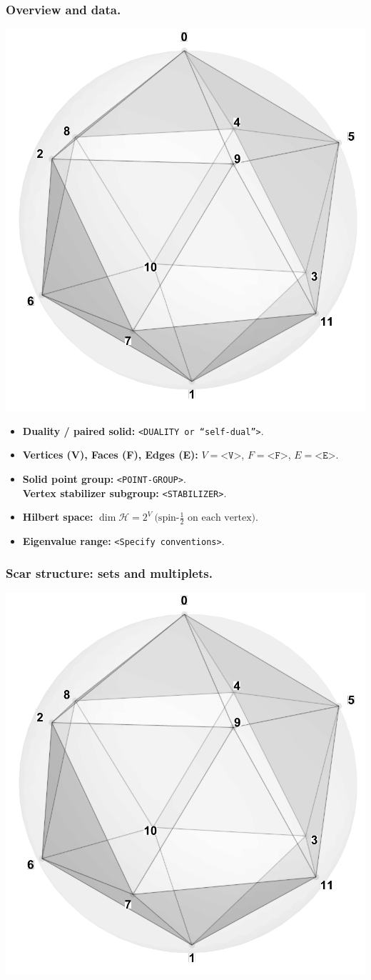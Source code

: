 \documentclass[11pt,a4paper]{article}
\begin{document}
\subsubsection*{Overview and data.}
\begin{center}
  \includegraphics[width=.6\linewidth]{icosahedron}
\end{center}

\begin{itemize}[leftmargin=1.5em]
  \item \textbf{Duality / paired solid:} \texttt{<DUALITY or “self-dual”>}.
  \item \textbf{Vertices (V), Faces (F), Edges (E):} $V=\texttt{<V>}$,\; $F=\texttt{<F>}$,\; $E=\texttt{<E>}$.
  \item \textbf{Solid point group:} \texttt{<POINT-GROUP>}.\\
        \textbf{Vertex stabilizer subgroup:} \texttt{<STABILIZER>}.
  \item \textbf{Hilbert space:} \(
        \dim\mathcal{H} = 2^{V}\ \text{(spin-$\tfrac12$ on each vertex).}
        \)
  \item \textbf{Eigenvalue range:} \texttt{<Specify conventions>}.
\end{itemize}

\subsubsection*{Scar structure: sets and multiplets.}
\begin{center}
  \includegraphics[width=.6\linewidth]{icosahedron}
\end{center}
\end{document}
